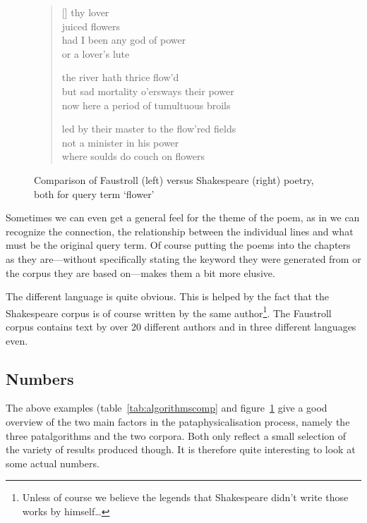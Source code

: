 \begin{figure}[!htbp]
\begin{minipage}{.45\linewidth}
\begin{verse}[\versewidth]
    thy lover\\
    juiced flowers\\
    had I been any god of power\\
    or a lover's lute

    the river hath thrice flow'd\\
    but sad mortality o'ersways their power\\
    now here a period of tumultuous broils

    led by their master to the flow'red fields\\
    not a minister in his power\\
    where soulds do couch on flowers
  \end{verse}
\end{minipage}
\caption[Faustroll vs. Shakespeare poetry]{Comparison of Faustroll (left) versus Shakespeare (right) poetry, both for query term `flower'}
\label{fig:2poems}
\end{figure}

Sometimes we can even get a general feel for the theme of the poem, as in we can recognize the connection, the relationship between the individual lines and what must be the original query term. Of course putting the poems into the chapters as they are---without specifically stating the keyword they were generated from or the corpus they are based on---makes them a bit more elusive.

The different language is quite obvious. This is helped by the fact that the Shakespeare corpus is of course written by the same author\footnote{Unless of course we believe the legends that Shakespeare didn't write those works by himself\ldots}. The Faustroll corpus contains text by over \num{20} different authors and in three different languages even.


\subsection{Numbers}
\label{s:numbers}

The above examples (table~\ref{tab:algorithmscomp} and figure~\ref{fig:2poems} give a good overview of the two main factors in the pataphysicalisation process, namely the three patalgorithms and the two corpora. Both only reflect a small selection of the variety of results produced though. It is therefore quite interesting to look at some actual numbers.

